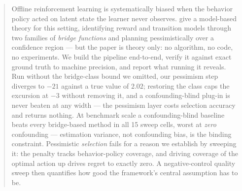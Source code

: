 \documentclass{article}
\theoremstyle{plain}
\theoremstyle{definition}
\begin{document}

\printAffiliationsAndNotice{}

\begin{abstract}
Offline reinforcement learning is systematically biased when the behavior policy
acted on latent state the learner never observes. \citet{hong2024} give a
model-based theory for this setting, identifying reward and transition models
through two families of \emph{bridge functions} and planning pessimistically over
a confidence region --- but the paper is theory only: no algorithm, no code, no
experiments. We build the pipeline end-to-end, verify it against exact ground
truth to machine precision, and report what running it reveals. Run without the
bridge-class bound we omitted, our pessimism step diverges to $-21$ against a
true value of $2.02$; restoring the class caps the excursion at $-3$ without
removing it, and a confounding-blind plug-in is never beaten at any width --- the
pessimism layer costs selection accuracy and returns nothing. At benchmark scale a
confounding-blind baseline beats every bridge-based method in all 15 sweep cells,
worst at \emph{zero} confounding --- estimation variance, not confounding bias,
is the binding constraint. Pessimistic \emph{selection} fails for a reason we
establish by sweeping it: the penalty tracks behavior-policy coverage, and
driving coverage of the optimal action up drives regret to exactly zero. A
negative-control quality sweep then quantifies how good the framework's central
assumption has to be.
\end{abstract}
\end{document}
